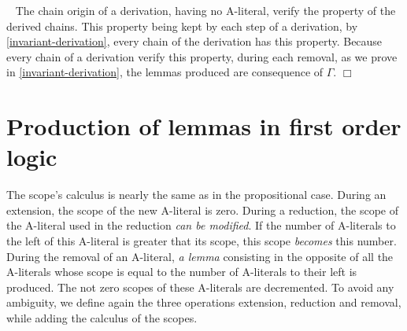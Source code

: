 \documentclass{article}
\newenvironment{preuve}{\noindent {\em Proof :}\ }{{\hfill
    $\Box$}\vspace{.5pc}} \newcommand{\sg}{\!\!<\!\!}
\begin{document}
\begin{preuve}
The chain origin of a derivation, having no A-literal, verify the property of the derived chains.
This property being kept by each step of a derivation, by \ref{invariant-derivation}, every chain of the derivation has this 
property. Because every chain of a derivation verify this property, during each removal, 
as we prove in \ref{invariant-derivation}, the lemmas produced are consequence of $\Gamma$. 
\end{preuve}




\section{Production of lemmas in first order logic}

The scope's calculus is nearly the same as in the propositional case.
During an extension, the scope of the new A-literal is zero.
During a reduction, the scope of the A-literal used in the reduction \emph{can be modified}.
If the number of A-literals to the left of this A-literal is greater that its scope, this scope \emph{becomes}
this number.
During the removal of an A-literal, \emph{a lemma} consisting in the opposite of all the A-literals whose scope is equal to the
number of A-literals to their left is produced. 
The not zero scopes of these A-literals are decremented.
To avoid any ambiguity, we define again the three operations extension, reduction and removal, while adding the 
calculus of the scopes.
\end{document}
